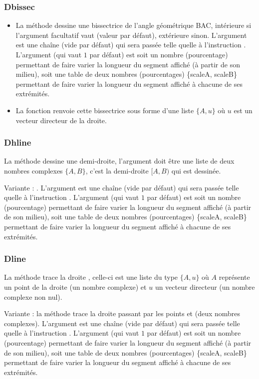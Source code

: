 \newcommand*{\arguScale}{%
L'argument \argu{scale} (qui vaut $1$ par défaut) est soit un nombre (pourcentage) permettant de faire varier la longueur du segment affiché (à partir de son milieu), soit une table de deux nombres (pourcentages) \{scaleA, scaleB\} permettant de faire varier la longueur du segment affiché à chacune de ses extrémités.
}%

\subsubsection{Dbissec}
\begin{itemize}
    \item La méthode  dessine une bissectrice de l'angle géométrique BAC, intérieure si l'argument facultatif  vaut \true (valeur par défaut), extérieure sinon. L'argument  est une chaîne (vide par défaut) qui sera passée telle quelle à l'instruction \drawcmd. \arguScale
  \item La fonction  renvoie cette bissectrice sous forme d'une liste $\{A,u\}$ où $u$ est un vecteur directeur de la droite.
\end{itemize}

\subsubsection{Dhline}
La méthode  dessine une demi-droite, l'argument  doit être une liste de deux nombres complexes $\{A,B\}$, c'est la demi-droite $[A,B)$ qui est dessinée.

Variante : . L'argument  est une chaîne (vide par défaut) qui sera passée telle quelle à l'instruction \drawcmd. \arguScale


\subsubsection{Dline}
La méthode  trace la droite , celle-ci est une liste du type $\{A,u\}$ où $A$ représente un point de la droite (un nombre complexe) et $u$ un vecteur directeur (un nombre complexe non nul). 

Variante : la méthode  trace la droite passant par les points  et  (deux nombres complexes). L'argument  est une chaîne (vide par défaut) qui sera passée telle quelle à l'instruction \drawcmd. \arguScale

